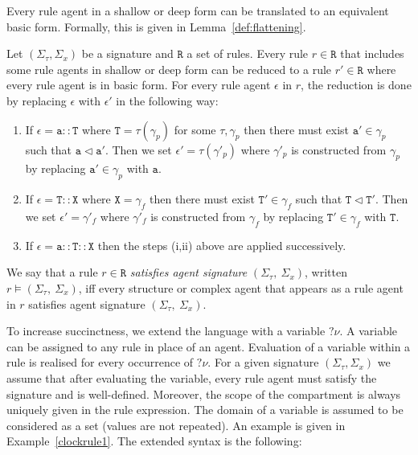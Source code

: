 \documentclass{entcs}
\renewcommand{\~}[0]{\texttildelow}
\begin{document}
Every rule agent in a shallow or deep form can be translated to an equivalent basic form. Formally, this is given in Lemma~\ref{def:flattening}.

\begin{lemma}
\label{def:flattening}
Let $(\Sigma_\tau,\Sigma_x)$ be a signature and $\mathtt{R}$ a set of rules. Every rule $r\in\mathtt{R}$ that includes some rule agents in shallow or deep form can be reduced to a rule $r'\in\mathtt{R}$ where every rule agent is in basic form. For every rule agent $\epsilon$ in $r$, the reduction is done by replacing $\epsilon$ with $\epsilon'$ in the following way:
\begin{enumerate}
\item If $\epsilon=\mathtt{a}::\mathtt{T}$ where $\mathtt{T}=\tau(\gamma_p)$ for some $\tau,\gamma_p$ then there must exist $\mathtt{a}'\in\gamma_p$ such that $\mathtt{a}\lhd\mathtt{a}'$. Then we set $\epsilon'={\tau}(\gamma'_p)$ where $\gamma'_p$ is constructed from $\gamma_p$ by replacing $\mathtt{a}'\in\gamma_p$ with $\mathtt{a}$.
\item If $\epsilon=\mathtt{T}::\mathtt{X}$ where $\mathtt{X}=\gamma_f$ then there must exist $\mathtt{T}'\in\gamma_f$ such that $\mathtt{T}\lhd\mathtt{T}'$. Then we set $\epsilon'=\gamma'_f$ where $\gamma'_f$ is constructed from $\gamma_f$ by replacing $\mathtt{T}'\in\gamma_f$ with $\mathtt{T}$. 
\item If $\epsilon=\mathtt{a}::\mathtt{T}::\mathtt{X}$ then the steps (i,ii) above are applied successively.
\end{enumerate} 
\end{lemma}

\begin{definition}
We say that a rule $r\in\mathtt{R}$ \emph{satisfies agent signature} $(\Sigma_\tau,~\Sigma_x)$, written $r\models (\Sigma_\tau,~\Sigma_x)$, iff every structure or complex agent that appears as a rule agent in $r$ satisfies agent signature $(\Sigma_\tau,~\Sigma_x)$.
\end{definition}

To increase succinctness, we extend the language with a variable $?\nu$. A variable can be assigned to any rule in place of an agent. Evaluation of a variable within a rule is realised for every occurrence of $?\nu$. For a given signature $(\Sigma_\tau,\Sigma_x)$ we assume that after evaluating the variable, every rule agent must satisfy the signature and is well-defined. Moreover, the scope of the compartment is always uniquely given in the rule expression. The domain of a variable is assumed to be considered as a set (values are not repeated). An example is given in Example~\ref{clockrule1}. The extended syntax is the following:
\end{document}
